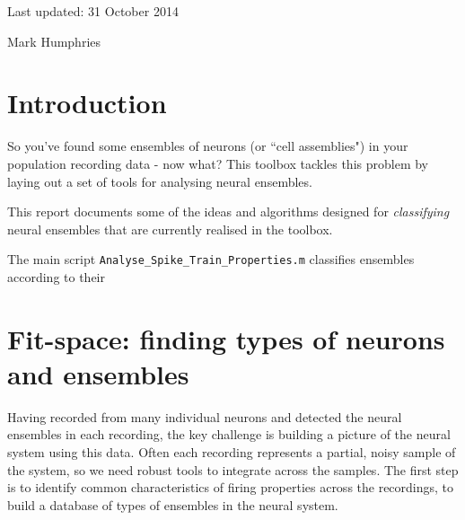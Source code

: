 \documentclass[11pt,a4paper]{article}
\begin{document}

\vspace{5mm}

\noindent Last updated: 31 October 2014

\vspace{5mm}

\noindent Mark Humphries
\vspace{5mm}

\tableofcontents

\vspace{0.5cm}

\section{Introduction}
So you've found some ensembles of neurons (or ``cell assemblies") in your population recording data - now what? This toolbox tackles this problem by laying out a set of tools for analysing neural ensembles.

This report documents some of the ideas and algorithms designed for {\em classifying} neural ensembles that are currently realised in the toolbox.

The main script {\tt Analyse_Spike_Train_Properties.m} classifies ensembles according to their 

\section{Fit-space: finding types of neurons and ensembles}

Having recorded from many individual neurons and detected the neural ensembles in each recording, the key challenge is building a picture of the neural system using this data. Often each recording represents a partial, noisy sample of the system, so we need robust tools to integrate across the samples. The first step is to identify common characteristics of firing properties across the recordings, to build a database of types of ensembles in the neural system.
\end{document}
